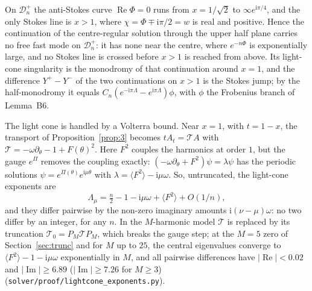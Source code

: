 \documentclass{amsart}
\numberwithin{equation}{section}
\theoremstyle{plain}
\newenvironment{lemnamed}[1]{\renewcommand\theinnerlem{#1}\innerlem}{\endinnerlem}
\theoremstyle{definition}
\theoremstyle{remark}
\newcommand{\re}{\operatorname{Re}}
\newcommand{\im}{\operatorname{Im}}
\newcommand{\iu}{\mathrm{i}}
\newcommand{\repo}[1]{\texttt{#1}}
\begin{document}
\begin{lemnamed}{B8.2 (Stokes geometry)}\label{lem:B82}
On $\mathcal D^+_n$ the anti-Stokes curve $\re\Phi = 0$ runs from $x = 1/\sqrt2$ to $\infty e^{\iu\pi/4}$, and the only Stokes
line is $x > 1$, where $\chi = \Phi \mp \iu\pi/2 = w$ is real and positive. Hence the continuation of the centre-regular
solution through the upper half plane carries no free fast mode on $\mathcal D^+_n$: it has none near the centre, where
$e^{-n\Phi}$ is exponentially large, and no Stokes line is crossed before $x > 1$ is reached from above. Its light-cone
singularity is the monodromy of that continuation around $x = 1$, and the difference $Y^+ - Y^-$ of the two continuations
on $x > 1$ is the Stokes jump; by the half-monodromy it equals $C_n(e^{-\iu\pi\Lambda} - e^{\iu\pi\Lambda})\phi$, with $\phi$ the
Frobenius branch of Lemma~B6.
\end{lemnamed}

The light cone is handled by a Volterra bound. Near $x = 1$, with $t = 1 - x$, the transport of Proposition~\ref{prop:3}
becomes $tA_t = \mathcal T A$ with $\mathcal T = -\omega\partial_\theta - 1 + F(\theta)^2$. Here $F^2$ couples the harmonics at
order $1$, but the gauge $e^{\Pi}$ removes the coupling exactly: $(-\omega\partial_\theta + F^2)\psi = \lambda\psi$ has the
periodic solutions $\psi = e^{\Pi(\theta)}e^{\iu\mu\theta}$ with $\lambda = \langle F^2\rangle - \iu\mu\omega$. So, untruncated, the
light-cone exponents are
\begin{equation}\label{eq:Lambda}
\Lambda_\mu = \tfrac n2 - 1 - \iu\mu\omega + \langle F^2\rangle + O(1/n),
\end{equation}
and they differ pairwise by the non-zero imaginary amounts $\iu(\nu-\mu)\omega$: no two differ by an integer, for any $n$.
In the $M$-harmonic model $\mathcal T$ is replaced by its truncation $\mathcal T_0 = P_M\mathcal TP_M$, which breaks the gauge step; at
the $M = 5$ zero of Section~\ref{sec:trunc} and for $M$ up to $25$, the central eigenvalues converge to
$\langle F^2\rangle - 1 - \iu\mu\omega$ exponentially in $M$, and all pairwise differences have $|\re| < 0.02$ and
$|\im| \ge 6.89$ ($|\im| \ge 7.26$ for $M \ge 3$) (\repo{solver/proof/lightcone\_exponents.py}).
\end{document}
